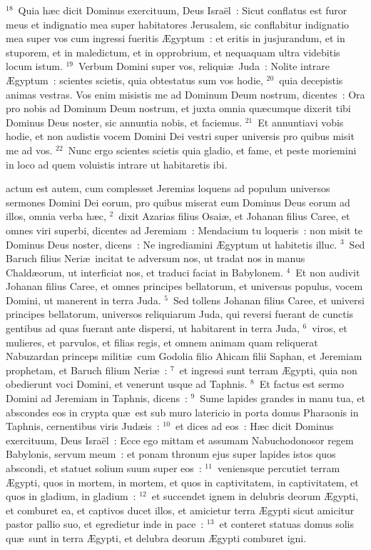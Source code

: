 ${}^{18}$~Quia h\ae c dicit Dominus exercituum, Deus Isra\"el~: Sicut conflatus est furor meus et indignatio mea super habitatores Jerusalem, sic conflabitur indignatio mea super vos cum ingressi fueritis \AE gyptum~: et eritis in jusjurandum, et in stuporem, et in maledictum, et in opprobrium, et nequaquam ultra videbitis locum istum.
${}^{19}$~Verbum Domini super vos, reliqui\ae\ Juda~: Nolite intrare \AE gyptum~: scientes scietis, quia obtestatus sum vos hodie,
${}^{20}$~quia decepistis animas vestras. Vos enim misistis me ad Dominum Deum nostrum, dicentes~: Ora pro nobis ad Dominum Deum nostrum, et juxta omnia qu\ae cumque dixerit tibi Dominus Deus noster, sic annuntia nobis, et faciemus.
${}^{21}$~Et annuntiavi vobis hodie, et non audistis vocem Domini Dei vestri super universis pro quibus misit me ad vos.
${}^{22}$~Nunc ergo scientes scietis quia gladio, et fame, et peste moriemini in loco ad quem voluistis intrare ut habitaretis ibi.

\bchapter
{}actum est autem, cum complesset Jeremias loquens ad populum universos sermones Domini Dei eorum, pro quibus miserat eum Dominus Deus eorum ad illos, omnia verba h\ae c,
${}^{2}$~dixit Azarias filius Osai\ae , et Johanan filius Caree, et omnes viri superbi, dicentes ad Jeremiam~: Mendacium tu loqueris~: non misit te Dominus Deus noster, dicens~: Ne ingrediamini \AE gyptum ut habitetis illuc.
${}^{3}$~Sed Baruch filius Neri\ae\ incitat te adversum nos, ut tradat nos in manus Chald\ae orum, ut interficiat nos, et traduci faciat in Babylonem.
${}^{4}$~Et non audivit Johanan filius Caree, et omnes principes bellatorum, et universus populus, vocem Domini, ut manerent in terra Juda.
${}^{5}$~Sed tollens Johanan filius Caree, et universi principes bellatorum, universos reliquiarum Juda, qui reversi fuerant de cunctis gentibus ad quas fuerant ante dispersi, ut habitarent in terra Juda,
${}^{6}$~viros, et mulieres, et parvulos, et filias regis, et omnem animam quam reliquerat Nabuzardan princeps militi\ae\ cum Godolia filio Ahicam filii Saphan, et Jeremiam prophetam, et Baruch filium Neri\ae~:
${}^{7}$~et ingressi sunt terram \AE gypti, quia non obedierunt voci Domini, et venerunt usque ad Taphnis.
${}^{8}$~Et factus est sermo Domini ad Jeremiam in Taphnis, dicens~:
${}^{9}$~Sume lapides grandes in manu tua, et abscondes eos in crypta qu\ae\ est sub muro latericio in porta domus Pharaonis in Taphnis, cernentibus viris Jud\ae is~:
${}^{10}$~et dices ad eos~: H\ae c dicit Dominus exercituum, Deus Isra\"el~: Ecce ego mittam et assumam Nabuchodonosor regem Babylonis, servum meum~: et ponam thronum ejus super lapides istos quos abscondi, et statuet solium suum super eos~:
${}^{11}$~veniensque percutiet terram \AE gypti, quos in mortem, in mortem, et quos in captivitatem, in captivitatem, et quos in gladium, in gladium~:
${}^{12}$~et succendet ignem in delubris deorum \AE gypti, et comburet ea, et captivos ducet illos, et amicietur terra \AE gypti sicut amicitur pastor pallio suo, et egredietur inde in pace~:
${}^{13}$~et conteret statuas domus solis qu\ae\ sunt in terra \AE gypti, et delubra deorum \AE gypti comburet igni.

